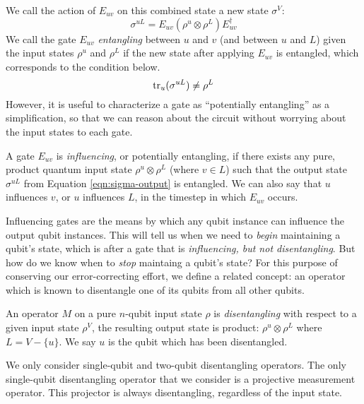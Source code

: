 We call the action of $E_{uv}$ on this combined state a new state $\sigma^{V}$:
%
\begin{equation}
\sigma^{uL} = E_{uv} (\rho^{u}\otimes \rho^{L}) E^{\dagger}_{uv}
\label{eqn:sigma-output}
\end{equation}
%
We call the gate $E_{uv}$ \emph{entangling} between $u$ and $v$
(and between $u$ and $L$) given the input states $\rho^{u}$ and $\rho^{L}$ if
the new state after applying $E_{uv}$ is entangled, which corresponds to
the condition below.
%
\begin{equation}
\text{tr}_{u}( \sigma^{uL} ) \ne \rho^{L}
\end{equation}
%
However, it is useful to characterize a gate as ``potentially entangling''
as a simplification, so that we can reason about the circuit without
worrying about the input states to each gate.
%
\begin{definition}
A gate $E_{uv}$ is \emph{influencing}, or potentially entangling, if
there exists any pure, product quantum input state $\rho^{u} \otimes \rho^{L}$
(where $v \in L$) such that the output state $\sigma^{uL}$ from
Equation \ref{eqn:sigma-output}
is entangled. We can also say that $u$ influences $v$, or $u$ influences
$L$, in the timestep in which $E_{uv}$ occurs.
\end{definition}

Influencing gates are the means by which any qubit instance can influence
the output qubit instances. This will tell us when we need to \emph{begin}
maintaining a qubit's state, which is after a gate that is
\emph{influencing, but not disentangling}.
But how do we know when to \emph{stop} maintaing a qubit's state?
For this purpose of conserving our error-correcting effort, we define
a related concept: an operator which is known to disentangle
one of its qubits from all other qubits.

\begin{definition}
An operator $M$ on a pure $n$-qubit input state $\rho$ is 
\emph{disentangling} with respect to a given input state $\rho^{V}$,
the resulting output state is product:
$\rho^{u} \otimes \rho^{L}$ where $L = V - \{u\}$.
We say $u$ is the
qubit which has been disentangled.
\end{definition}

We only consider single-qubit and two-qubit disentangling operators.
The only single-qubit disentangling operator that we consider
is a projective measurement operator. This projector is always disentangling,
regardless of the input state.

